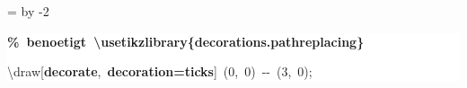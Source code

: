 \begingroup
\ttfamily
{}
=\textwidth
\advance{} by -2\fboxsep
\noindent
\colorbox{background}
{%
\parbox{\dimen255}
{%
\rule[-0.5ex]{0pt}{2.5ex}\hspace*{0.0em}\textcolor{G}{\textbf{\%~benoetigt~\textbackslash{}usetikzlibrary\{decorations.pathreplacing\}}}\\
\rule[-0.5ex]{0pt}{2.5ex}\hspace*{0.0em}\textbackslash{}draw[\textcolor{R}{\textbf{decorate}},~\textcolor{R}{\textbf{decoration=ticks}}]~(0,~0)~{-}{-}~(3,~0);}%
}%
\endgroup
